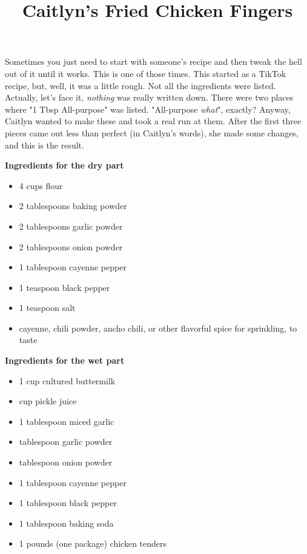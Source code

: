 \documentclass{article}
\title{Caitlyn's Fried Chicken Fingers}
\begin{document}
Sometimes you just need to start with someone's recipe and then tweak the hell out of it until it works.
This is one of those times. This started as a TikTok recipe, but, well, it was a little rough. Not all
the ingredients were listed. Actually, let's face it, \emph{nothing} was really written down. There were
two places where "1 Tbsp All-purpose" was listed. "All-purpose \emph{what}", exactly? Anyway, Caitlyn wanted to make these and took a real run at them. After the first three pieces came out
less than perfect (in Caitlyn's words), she made some changes, and this is the result.

\begin{multicols}{2}

    \textbf{Ingredients for the dry part}

    \begin{itemize}
        \setlength\itemsep{-0.5em}
        \item 4 cups flour
        \item 2 tablespoons baking powder
        \item 2 tablespoons garlic powder
        \item 2 tablespoons onion powder
        \item 1 tablespoon cayenne pepper
        \item 1 teaspoon black pepper
        \item 1 teaspoon salt

        \item cayenne, chili powder, ancho chili, or other flavorful spice for sprinkling, to taste
    \end{itemize}

    \columnbreak

    \textbf{Ingredients for the wet part}

    \begin{itemize}
        \setlength\itemsep{-0.5em}
        \item 1 cup cultured buttermilk
        \item {} cup pickle juice
        \item 1 tablespoon miced garlic
        \item {} tablespoon garlic powder
        \item {} tablespoon onion powder
        \item 1 tablespoon cayenne pepper
        \item 1 tablespoon black pepper
        \item 1 tablespoon baking soda

        \item 1 pounds (one package) chicken tenders
    \end{itemize}

\end{multicols}
\end{document}
